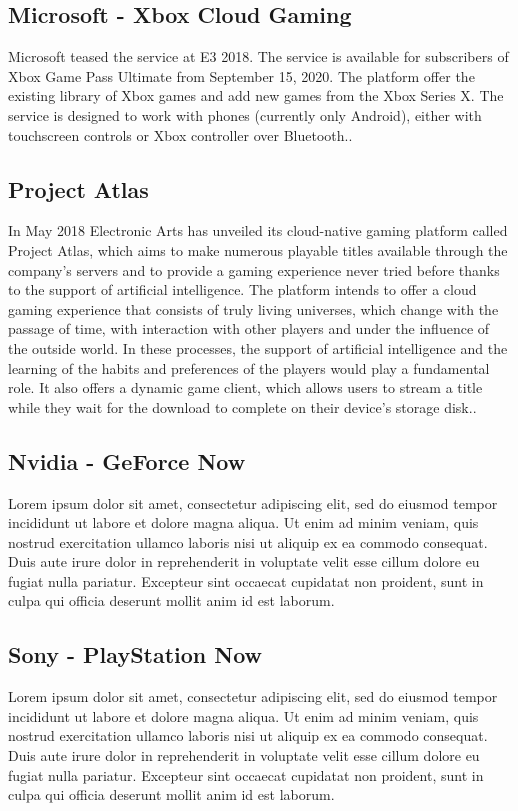 \subsection{Microsoft - Xbox Cloud Gaming}
Microsoft teased the service at E3 2018. The service is available for subscribers of Xbox Game Pass Ultimate from September 15, 2020. The platform offer the existing library of Xbox games and add new games from the Xbox Series X. The service is designed to work with phones (currently only Android), either with touchscreen controls or Xbox controller over Bluetooth.\cite{Xbox_Game_Pass_cloud_gaming}.
\subsection{Project Atlas}
In May 2018 Electronic Arts has unveiled its cloud-native gaming platform called Project Atlas, which aims to make numerous playable titles available through the company's servers and to provide a gaming experience never tried before thanks to the support of artificial intelligence. The platform intends to offer a cloud gaming experience that consists of truly living universes, which change with the passage of time, with interaction with other players and under the influence of the outside world. In these processes, the support of artificial intelligence and the learning of the habits and preferences of the players would play a fundamental role. It also offers a dynamic game client, which allows users to stream a title while they wait for the download to complete on their device's storage disk.\cite{Project_Atlas}.
\subsection{Nvidia - GeForce Now}
Lorem ipsum dolor sit amet, consectetur adipiscing elit, sed do eiusmod tempor incididunt ut labore et dolore magna aliqua. Ut enim ad minim veniam, quis nostrud exercitation ullamco laboris nisi ut aliquip ex ea commodo consequat. Duis aute irure dolor in reprehenderit in voluptate velit esse cillum dolore eu fugiat nulla pariatur. Excepteur sint occaecat cupidatat non proident, sunt in culpa qui officia deserunt mollit anim id est laborum\cite{GeForce_Now}.
\subsection{Sony - PlayStation Now}
Lorem ipsum dolor sit amet, consectetur adipiscing elit, sed do eiusmod tempor incididunt ut labore et dolore magna aliqua. Ut enim ad minim veniam, quis nostrud exercitation ullamco laboris nisi ut aliquip ex ea commodo consequat. Duis aute irure dolor in reprehenderit in voluptate velit esse cillum dolore eu fugiat nulla pariatur. Excepteur sint occaecat cupidatat non proident, sunt in culpa qui officia deserunt mollit anim id est laborum\cite{PlayStation_Now}.
